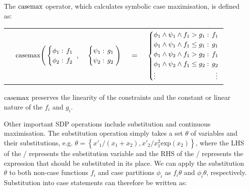 The $\mathrm{casemax}$ operator, which calculates symbolic case maximisation,
is defined as:
\vspace{-6.5mm}
{\small 
\abovedisplayskip=0pt
\belowdisplayskip=0pt
\begin{center}
  \begin{tabular}{r c c c l}
  &
  \hspace{-7mm} $\mathrm{casemax} \Bigg(
    \begin{cases}
        \phi_1: \hspace{-1mm} & \hspace{-1mm} f_1 \\ 
        \phi_2: \hspace{-1mm} & \hspace{-1mm} f_2 \\ 
    \end{cases}$
  $,$
  &
  \hspace{-4mm}
    $\begin{cases}
        \psi_1: \hspace{-1mm} & \hspace{-1mm} g_1 \\ 
        \psi_2: \hspace{-1mm} & \hspace{-1mm} g_2 \\ 
    \end{cases} \Bigg)$
  &
  \hspace{-4mm} 
  $ = $
  &
  \hspace{-4mm}
    $\begin{cases}
      \phi_1 \wedge \psi_1 \wedge f_1 > g_1    : & \hspace{-2mm} f_1 \\ 
      \phi_1 \wedge \psi_1 \wedge f_1 \leq g_1 : & \hspace{-2mm} g_1 \\ 
      \phi_1 \wedge \psi_2 \wedge f_1 > g_2    : & \hspace{-2mm} f_1 \\ 
      \phi_1 \wedge \psi_2 \wedge f_1 \leq g_2 : & \hspace{-2mm} g_2 \\ 
      \vdots & \vdots
    \end{cases}$
  \end{tabular}
\end{center}
}%
$\mathrm{casemax}$ preserves the linearity of the constraints and the constant 
or linear nature of the $f_i$ and $g_i$. 

Other important SDP operations include substitution and continuous maximisation. 
The substitution operation simply takes a set $\theta$ of variables and their
substitutions, e.g. $\theta = \left\{ x'_1/(x_1 + x_2), x'_2/x^2_{1} \text{exp}(x_2) \right\}$,
where the LHS of the / represents the substitution variable and the 
RHS of the / represents the expression that should be substituted in its place.
We can apply the substitution $\theta$ to both non-case functions $f_i$
and case partitions $\phi_i$ as $f_i\theta$ and $\phi_i\theta$, respectively.
Substitution into case statements can therefore be written as:


